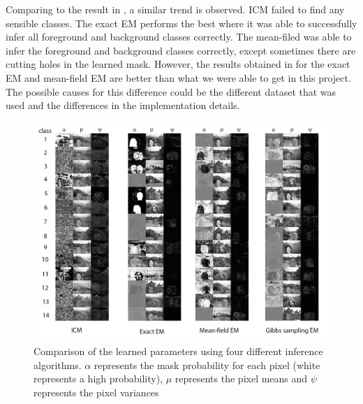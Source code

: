 \documentclass{article} %
\begin{document}
Comparing to the result in \cite{b2}, a similar trend is observed. ICM failed to find any sensible classes. The exact EM performs the best where it was able to successfully infer all foreground and background classes correctly. The mean-filed was able to infer the foreground and background classes correctly, except sometimes there are cutting holes in the learned mask. However, the results obtained in \cite{b2} for the exact EM and mean-field EM are better than what we were able to get in this project. The possible causes for this difference could be the different dataset that was used and the differences in the implementation details.

\begin{figure}[h]
\begin{center}
\includegraphics[width=1\textwidth]{final_plot1}
\end{center}
\caption{Comparison of the learned parameters using four different inference algorithms. \textit{$\alpha$} represents the mask probability for each pixel (white represents a high probability), \textit{$\mu$} represents the pixel means and \textit{$\psi$} represents the pixel variances}
\label{fig:model_com}
\end{figure}
\end{document}
